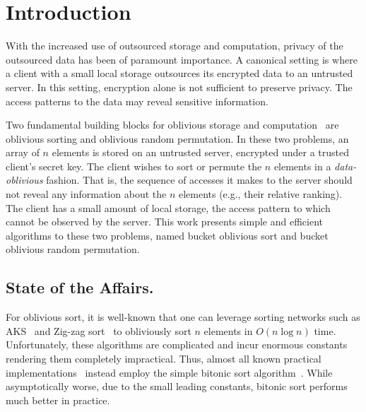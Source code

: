 


\section{Introduction}

With the increased use of outsourced storage and computation, privacy of the outsourced data has been of paramount importance. 
A canonical setting is where a client with a small local
storage outsources its encrypted data to an untrusted server. 
In this setting, encryption alone is not sufficient to preserve privacy.
The access patterns to the data may reveal sensitive information. 

Two fundamental building blocks for oblivious storage and computation~\cite{goldreich1996software,goodrich2011privacy,oblivistore} are oblivious sorting and oblivious random permutation.
In these two problems, an array of $n$ elements is stored on an untrusted server, encrypted under a trusted client's secret key.
The client wishes to sort or permute the $n$ elements in a \emph{data-oblivious} fashion.
That is, the sequence of accesses it makes to the server should not reveal any information about the $n$ elements (e.g., their relative ranking).
The client has a small amount of local storage, the access pattern to which cannot be observed by the server.
This work presents simple and efficient algorithms to these two problems, named bucket oblivious sort and bucket oblivious random permutation.

\subsection{State of the Affairs.}
For oblivious sort, it is well-known that one can leverage 
sorting networks such as AKS~\cite{aks} and Zig-zag sort~\cite{zigzag}
to obliviously sort $n$ elements in $O(n\log n)$ time. 
Unfortunately, these algorithms are complicated and incur enormous constants rendering them completely impractical. 
Thus, almost all known practical implementations~\cite{oblivistore,oblivm,graphsc}
instead employ the simple bitonic sort algorithm~\cite{bitonic}. 
While asymptotically worse, due to the small leading constants, bitonic sort performs much better in practice.

